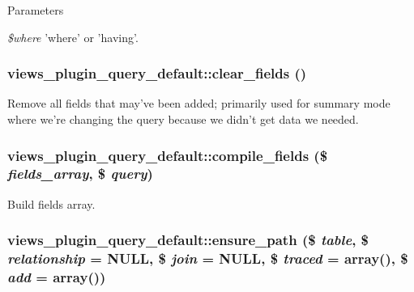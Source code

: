 \begin{DoxyParams}{Parameters}
\item[{\em \$where}]'where' or 'having'. \end{DoxyParams}
\hypertarget{classviews__plugin__query__default_a4668bd51fabda2e6f8045508a514027d}{
\subsubsection[{clear\_\-fields}]{\setlength{\rightskip}{0pt plus 5cm}views\_\-plugin\_\-query\_\-default::clear\_\-fields ()}}
\label{classviews__plugin__query__default_a4668bd51fabda2e6f8045508a514027d}
Remove all fields that may've been added; primarily used for summary mode where we're changing the query because we didn't get data we needed. \hypertarget{classviews__plugin__query__default_a5de4d68210747a47374575b87e5ce9e1}{
\subsubsection[{compile\_\-fields}]{\setlength{\rightskip}{0pt plus 5cm}views\_\-plugin\_\-query\_\-default::compile\_\-fields (\$ {\em fields\_\-array}, \/  \$ {\em query})}}
\label{classviews__plugin__query__default_a5de4d68210747a47374575b87e5ce9e1}
Build fields array. \hypertarget{classviews__plugin__query__default_accfbae81f0baa64215da42dfc9ce14ee}{
\subsubsection[{ensure\_\-path}]{\setlength{\rightskip}{0pt plus 5cm}views\_\-plugin\_\-query\_\-default::ensure\_\-path (\$ {\em table}, \/  \$ {\em relationship} = {\ttfamily NULL}, \/  \$ {\em join} = {\ttfamily NULL}, \/  \$ {\em traced} = {\ttfamily array()}, \/  \$ {\em add} = {\ttfamily array()})}}
\label{classviews__plugin__query__default_accfbae81f0baa64215da42dfc9ce14ee}

